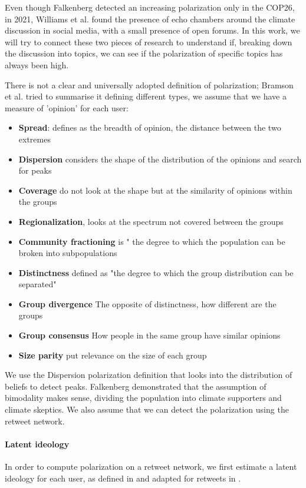 Even though Falkenberg detected an increasing polarization only in the COP26, in 2021, Williams et al. \cite{williams_network_2015} found the presence of echo chambers around the climate discussion in social media, with a small presence of open forums. In this work, we will try to connect these two pieces of research to understand if, breaking down the discussion into topics, we can see if the polarization of specific topics has always been high. 

There is not a clear and universally adopted definition of polarization; Bramson et al. \cite{bramson_understanding_2017} tried to summarise it defining different types, we assume that we have  a measure of 'opinion' for each user: 
\begin{itemize}
    \item \textbf{Spread}: defines as the breadth of opinion, the distance between the two extremes
    \item \textbf{Dispersion} considers the shape of the distribution of the opinions and search for peaks
    \item \textbf{Coverage} do not look at the shape but at the similarity of opinions within the groups
    \item \textbf{Regionalization}, looks at the spectrum not covered between the groups
    \item \textbf{Community fractioning} is " the degree to which the population can be broken into subpopulations
    \item \textbf{Distinctness} defined as  "the degree to which the group distribution can be separated"
    \item \textbf{Group divergence} The opposite of distinctness, how different are the groups
    \item  \textbf{Group consensus} How people in the same group have similar opinions
    \item  \textbf{Size parity } put relevance on the size of each group
\end{itemize}



 We use the Dispersion polarization definition that looks into the distribution of beliefs to detect peaks. Falkenberg demonstrated that the assumption of bimodality makes sense, dividing the population into climate supporters and climate skeptics. We also assume that we can detect the polarization using the retweet network.

\paragraph{Latent ideology}
In order to compute polarization on a retweet network, we first estimate a latent ideology for each user, as defined in \cite{barbera_birds_2015} and adapted for retweets in \cite{flamino_shifting_2021}.


